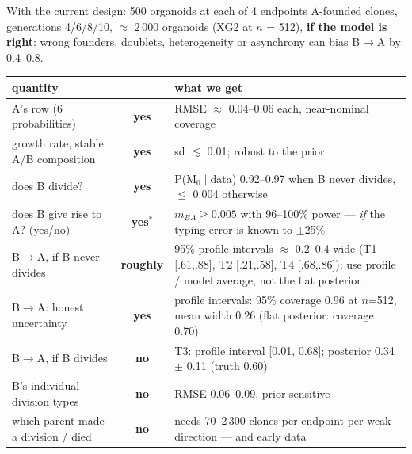 \documentclass[aspectratio=169,11pt]{beamer}
\newcommand{\BA}{B$\to$A}
\begin{document}
\begin{frame}{With the current design: 500 organoids at each of 4 endpoints}
{\small A-founded clones, generations 4/6/8/10, $\approx$ 2\,000 organoids (XG2 at $n$ = 512), \textbf{if the model is right}: wrong founders, doublets, heterogeneity or asynchrony can bias \BA{} by 0.4--0.8.}

\smallskip
{\footnotesize\setlength{\tabcolsep}{4pt}
\begin{tabular}{@{}p{4.4cm}cp{8.6cm}@{}}\toprule
quantity & & what we get \\\midrule
A's row (6 probabilities) & \textcolor{caqua}{\textbf{yes}} & RMSE $\approx$ 0.04--0.06 each, near-nominal coverage \\
growth rate, stable A/B composition & \textcolor{caqua}{\textbf{yes}} & sd $\lesssim$ 0.01; robust to the prior \\
does B divide? & \textcolor{caqua}{\textbf{yes}} & P(M$_0\mid$data) 0.92--0.97 when B never divides, $\le$ 0.004 otherwise \\
does B give rise to A? (yes/no) & \textcolor{caqua}{\textbf{yes}}$^\ast$ & $m_{BA} \ge 0.005$ with 96--100\% power --- \emph{if} the typing error is known to $\pm$25\% \\
\BA, if B never divides & \textcolor{corange}{\textbf{roughly}} & 95\% profile intervals $\approx$ 0.2--0.4 wide (T1 [.61,.88], T2 [.21,.58], T4 [.68,.86]); use profile / model average, not the flat posterior \\
\BA: honest uncertainty & \textcolor{caqua}{\textbf{yes}} & profile intervals: 95\% coverage 0.96 at $n$=512, mean width 0.26 (flat posterior: coverage 0.70) \\
\BA, if B divides & \alert{\textbf{no}} & T3: profile interval [0.01, 0.68]; posterior 0.34 $\pm$ 0.11 (truth 0.60) \\
B's individual division types & \alert{\textbf{no}} & RMSE 0.06--0.09, prior-sensitive \\
which parent made a division / died & \alert{\textbf{no}} & needs 70--2\,300 clones per endpoint per weak direction --- and early data \\\bottomrule
\end{tabular}}
\end{frame}
\end{document}
